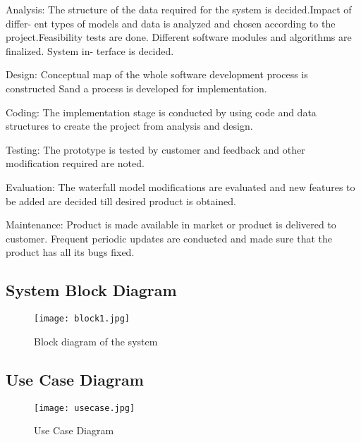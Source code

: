 \documentclass[a4paper,12pt]{report}
\begin{document}
\par Analysis: The structure of the data required for the system is
decided.Impact of differ- ent types of models and data is analyzed and
chosen according to the project.Feasibility tests are done. Different
software modules and algorithms are finalized. System in- terface is
decided.\\

\par Design:
Conceptual map of the whole software development process is constructed Sand
a process is developed for implementation.\\

\par Coding: The implementation stage is conducted by using code and data
structures to create the project from analysis and design.\\

\par Testing: The prototype is tested by customer and feedback and other
modification required are noted.\\

\par Evaluation: The waterfall model modifications are evaluated and new
features to be added are decided till desired product is obtained.\\

\par Maintenance: Product is made available in market or product is
delivered to customer. Frequent periodic updates are conducted and
made sure that the product has all its bugs fixed.\\

\pagebreak 
\subsection{System Block Diagram}

  \begin{figure}[h!]
    \centering
    \texttt{[image: block1.jpg]}
    \caption{Block diagram of the system}
  \end{figure}

\pagebreak 
\FloatBarrier
\subsection{Use Case Diagram}
\begin{figure}[h!]
\centering
\texttt{[image: usecase.jpg]}
\caption{Use Case Diagram}
\end{figure}
\end{document}

